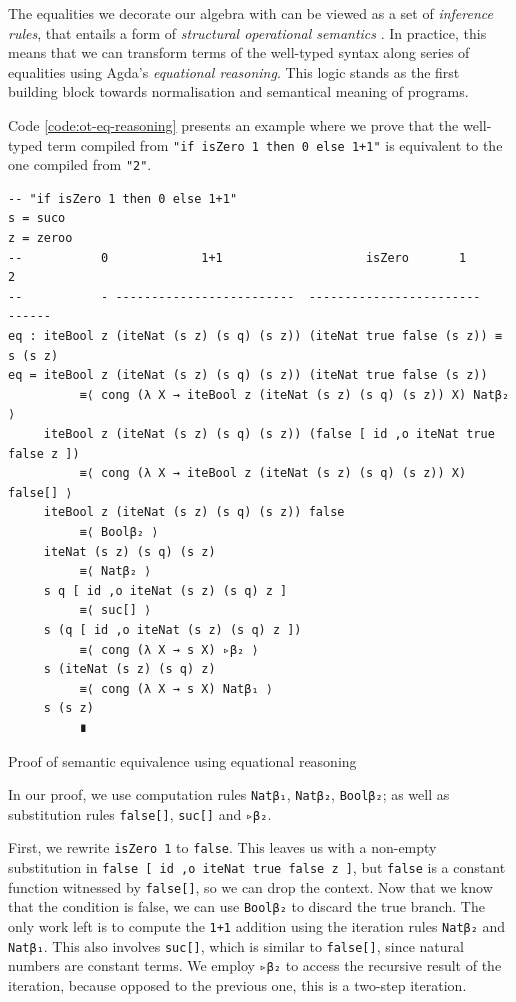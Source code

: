 The equalities we decorate our algebra with can be viewed as a set of \textit{inference rules}, that entails a form of \textit{structural operational semantics} \cite{plotkin1981structural}. In practice, this means that we can transform terms of the well-typed syntax along series of equalities using Agda's \textit{equational reasoning}. This logic stands as the first building block towards normalisation and semantical meaning of programs.

Code \ref{code:ot-eq-reasoning} presents an example where we prove that the well-typed term compiled from \verb$"if isZero 1 then 0 else 1+1"$ is equivalent to the one compiled from \verb$"2"$.

\begin{listing}[H]
\begin{verbatim}
-- "if isZero 1 then 0 else 1+1"
s = suco
z = zeroo
--           0             1+1                    isZero       1        2
--           - -------------------------  ------------------------    ------
eq : iteBool z (iteNat (s z) (s q) (s z)) (iteNat true false (s z)) ≡ s (s z)
eq = iteBool z (iteNat (s z) (s q) (s z)) (iteNat true false (s z))
          ≡⟨ cong (λ X → iteBool z (iteNat (s z) (s q) (s z)) X) Natβ₂ ⟩
     iteBool z (iteNat (s z) (s q) (s z)) (false [ id ,o iteNat true false z ])
          ≡⟨ cong (λ X → iteBool z (iteNat (s z) (s q) (s z)) X) false[] ⟩
     iteBool z (iteNat (s z) (s q) (s z)) false
          ≡⟨ Boolβ₂ ⟩
     iteNat (s z) (s q) (s z)
          ≡⟨ Natβ₂ ⟩
     s q [ id ,o iteNat (s z) (s q) z ]
          ≡⟨ suc[] ⟩
     s (q [ id ,o iteNat (s z) (s q) z ])
          ≡⟨ cong (λ X → s X) ▹β₂ ⟩
     s (iteNat (s z) (s q) z)
          ≡⟨ cong (λ X → s X) Natβ₁ ⟩
     s (s z)
          ∎
\end{verbatim}
\caption{Proof of semantic equivalence using equational reasoning}
\label{code:ot-eq-reasoning}
\end{listing}

In our proof, we use computation rules \verb$Natβ₁$, \verb$Natβ₂$, \verb$Boolβ₂$; as well as substitution rules \verb$false[]$, \verb$suc[]$ and \verb$▹β₂$.

First, we rewrite \verb$isZero 1$ to \verb$false$. This leaves us with a non-empty substitution in \verb$false [ id ,o iteNat true false z ]$, but \verb$false$ is a constant function witnessed by \verb$false[]$, so we can drop the context. Now that we know that the condition is false, we can use \verb$Boolβ₂$ to discard the true branch. The only work left is to compute the \verb$1+1$ addition using the iteration rules \verb$Natβ₂$ and \verb$Natβ₁$. This also involves \verb$suc[]$, which is similar to \verb$false[]$, since natural numbers are constant terms. We employ \verb$▹β₂$ to access the recursive result of the iteration, because opposed to the previous one, this is a two-step iteration.

